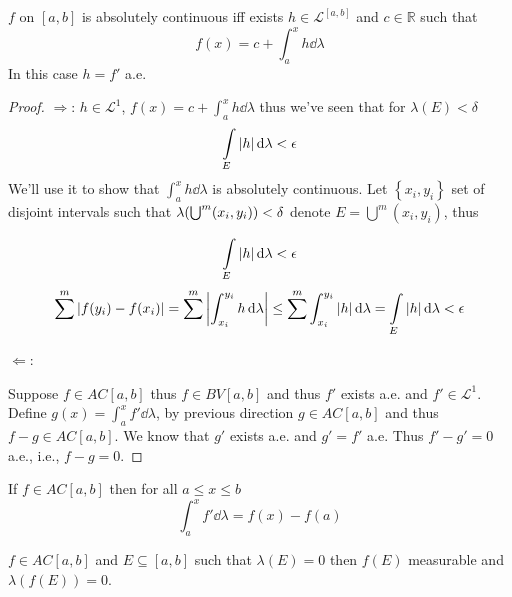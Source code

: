 \begin{theorem}
	$f$ on $[a,b]$ is absolutely continuous iff exists $h\in \mathcal{L}^[a,b]$ and $c\in \mathbb{R}$ such that
	$$f(x) = c + \int_a^x h \dd{\lambda}$$
	In this case $h=f'$ a.e.
\begin{proof}
	
	$\Rightarrow$:
	$h\in \mathcal{L}^1$, $f(x) = c+\int_a^x h \dd{\lambda}$ thus we've seen that for $\lambda(E) < \delta$
	$$\int\limits_E \abs{h} \dd{\lambda} < \epsilon$$
	We'll use it to show that $\int_a^x h\dd{\lambda}$ is absolutely continuous. Let $\left\{x_i,y_i\right\}$ set of disjoint intervals such that $\lambda\qty(\bigcup^m (x_i,y_i)) <\delta$ denote $E=\bigcup^m (x_i,y_i)$, thus
	
	$$\int\limits_E \abs{h} \dd{\lambda} < \epsilon$$
	$$\sum^m \abs{f(y_i) - f(x_i)} = \sum^m \abs{\int_{x_i}^{y_i} h \dd{\lambda}} \leq \sum^m \int_{x_i}^{y_i} \abs{h} \dd{\lambda} = \int\limits_E \abs{h} \dd{\lambda} < \epsilon$$
	
	
	$\Leftarrow$:
	
	Suppose $f\in AC[a,b]$ thus $f\in BV[a,b]$ and thus $f'$ exists a.e. and $f' \in \mathcal{L}^1$. Define $g(x) = \int_a^x f' \dd{\lambda}$, by previous direction $g\in AC[a,b]$ and thus $f-g \in AC[a,b]$. We know that $g'$ exists a.e. and $g'=f'$ a.e. Thus $f'-g'=0$ a.e., i.e., $f-g = 0$.
\end{proof}

\begin{coll}
	If $f\in AC[a,b]$ then for all $a\leq x\leq b$ 
	$$\int_a^x f' \dd{\lambda} = f(x)-f(a)$$
\end{coll}
\end{theorem}

\begin{prop}
	$f\in AC[a,b]$ and $E \subseteq [a,b]$ such that $\lambda(E) = 0$ then $f(E)$ measurable and $\lambda(f(E)) = 0$.
\end{prop}